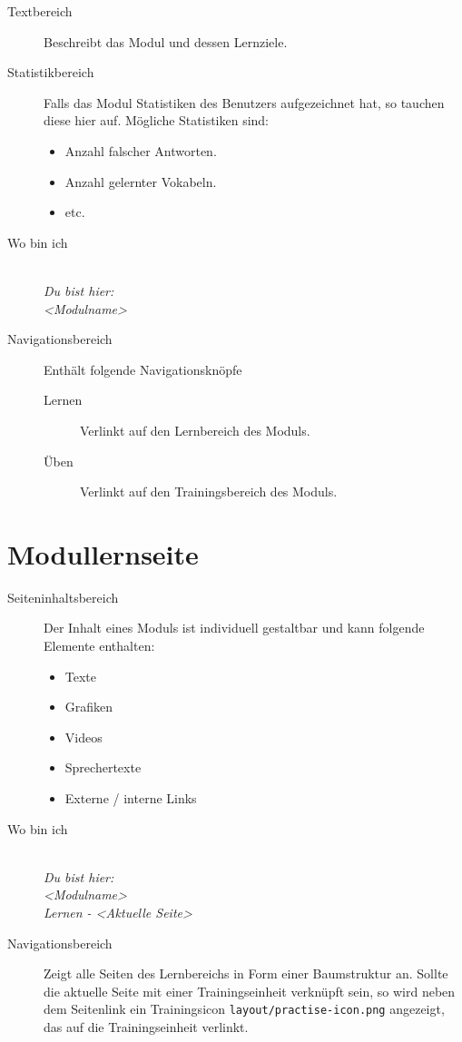 \begin{description}
  \item[Textbereich] Beschreibt das Modul und dessen Lernziele.
  \item[Statistikbereich] 
    Falls das Modul Statistiken des Benutzers aufgezeichnet hat, so tauchen diese hier auf. Mögliche Statistiken sind:
    \begin{itemize}
      \item Anzahl falscher Antworten.
      \item Anzahl gelernter Vokabeln.
      \item etc.
    \end{itemize}
  \item[Wo bin ich] 
    \emph{\\Du bist hier:\\<Modulname>}
  \item[Navigationsbereich] Enthält folgende Navigationsknöpfe
   \begin{description}
    \item[Lernen] Verlinkt auf den Lernbereich des Moduls.
    \item[Üben] Verlinkt auf den Trainingsbereich des Moduls.
   \end{description}
\end{description}

%
%
%
\section{Modullernseite}
\label{sec:hauptseite}

\begin{description}
  \item[Seiteninhaltsbereich] Der Inhalt eines Moduls ist individuell gestaltbar und kann folgende Elemente enthalten:
  \begin{itemize}
    \item Texte
    \item Grafiken
    \item Videos
    \item Sprechertexte
    \item Externe / interne Links
  \end{itemize}
  
  \item[Wo bin ich] \emph{\\Du bist hier:\\<Modulname>\\Lernen - <Aktuelle Seite>}
  \item[Navigationsbereich] Zeigt alle Seiten des Lernbereichs in Form einer Baumstruktur an. Sollte die aktuelle Seite mit einer Trainingseinheit verknüpft sein, so wird neben dem Seitenlink ein Trainingsicon \texttt{layout/practise-icon.png} angezeigt, das auf die Trainingseinheit verlinkt.
  
\end{description}



